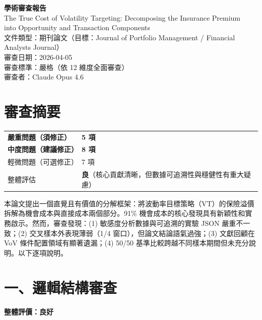 \documentclass[12pt,a4paper]{article}
\begin{document}
\begin{center}
{\Large\bfseries 學術審查報告}\\[0.5em]
{\large The True Cost of Volatility Targeting: Decomposing the Insurance Premium\\into Opportunity and Transaction Components}\\[0.5em]
{\normalsize 文件類型：期刊論文（目標：Journal of Portfolio Management / Financial Analysts Journal）}\\
{\normalsize 審查日期：2026-04-05}\\
{\normalsize 審查標準：嚴格（依 12 維度全面審查）}\\
{\normalsize 審查者：Claude Opus 4.6}
\end{center}

\bigskip

\section*{審查摘要}

\begin{tabular}{ll}
\textcolor{errorred}{\textbf{嚴重問題（須修正）}} & \textbf{5 項} \\
\textcolor{warncolor}{\textbf{中度問題（建議修正）}} & \textbf{8 項} \\
輕微問題（可選修正） & 7 項 \\
整體評估 & \textbf{良}（核心貢獻清晰，但數據可追溯性與穩健性有重大疑慮） \\
\end{tabular}

\bigskip

本論文提出一個直覺且有價值的分解框架：將波動率目標策略（VT）的保險溢價拆解為機會成本與直接成本兩個部分。91\% 機會成本的核心發現具有新穎性和實務啟示。然而，審查發現：(1) 敏感度分析數據與可追溯的實驗 JSON 嚴重不一致；(2) 交叉樣本外表現薄弱（1/4 窗口），但論文結論語氣過強；(3) 文獻回顧在 VoV 條件配置領域有顯著遺漏；(4) 50/50 基準比較跨越不同樣本期間但未充分說明。以下逐項說明。

\section*{一、邏輯結構審查}

\textcolor{okgreen}{\textbf{整體評價：良好}}
\end{document}
